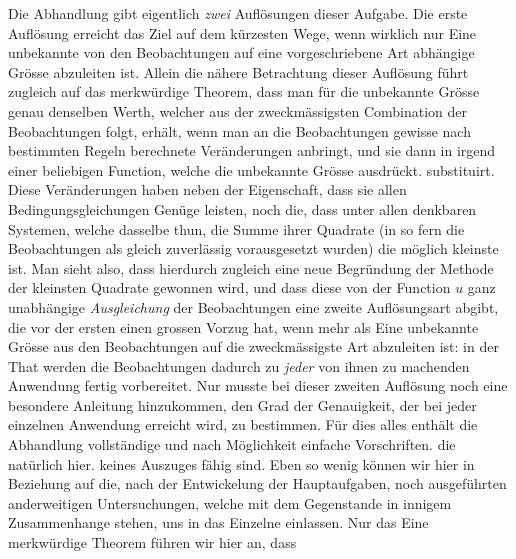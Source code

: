 Die Abhandlung gibt eigentlich \textit{zwei} Auflösungen dieser Aufgabe. Die erste Auflösung erreicht das Ziel auf dem kürzesten Wege, wenn wirklich nur Eine unbekannte von den Beobachtungen auf eine vorgeschriebene Art abhängige Grösse abzuleiten ist. Allein die nähere Betrachtung dieser Auflösung führt zugleich auf das merkwürdige Theorem, dass man für die unbekannte Grösse genau denselben Werth, welcher aus der zweckmässigsten Combination der Beobachtungen folgt, erhält, wenn man an die Beobachtungen gewisse nach bestimmten Regeln berechnete Veränderungen anbringt, und sie dann in irgend einer beliebigen Function, welche die unbekannte Grösse ausdrückt. substituirt. Diese Veränderungen haben neben der Eigenschaft, dass sie allen Bedingungsgleichungen Genüge leisten, noch die, dass unter allen denkbaren Systemen, welche dasselbe thun, die Summe ihrer Quadrate (in so fern die Beobachtungen als gleich zuverlässig vorausgesetzt wurden) die möglich kleinste ist. Man sieht also, dass hierdurch zugleich eine neue Begründung der Methode der kleinsten Quadrate gewonnen wird, und dass diese von der Function \(u\) ganz unabhängige \textit{Ausgleichung} der Beobachtungen eine zweite Auflösungsart abgibt, die vor der ersten einen grossen Vorzug hat, wenn mehr als Eine unbekannte Grösse aus den Beobachtungen auf die zweckmässigste Art abzuleiten ist: in der That werden die Beobachtungen dadurch zu \textit{jeder} von ihnen zu machenden Anwendung fertig vorbereitet. Nur musste bei dieser zweiten Auflösung noch eine besondere Anleitung hinzukommen, den Grad der Genauigkeit, der bei jeder einzelnen Anwendung erreicht wird, zu bestimmen. Für dies alles enthält die Abhandlung vollständige und nach Möglichkeit einfache Vorschriften. die natürlich hier. keines Auszuges fähig sind. Eben so wenig können wir hier in Beziehung auf die, nach der Entwickelung der Hauptaufgaben, noch ausgeführten anderweitigen Untersuchungen, welche mit dem Gegenstande in innigem Zusammenhange stehen, uns in das Einzelne einlassen. Nur das Eine merkwürdige Theorem führen wir hier an, dass
